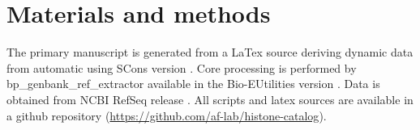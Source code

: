\section{Materials and methods}
\label{sec:matmethods}

	The primary manuscript is generated from a LaTex source 
	deriving dynamic data from automatic using SCons version  \citep{SCons2005}.
	Core processing is performed by bp\_genbank\_ref\_extractor
	available in the Bio-EUtilities version  \citep{BioPerl2002}.
	Data is obtained from NCBI RefSeq release .
	All scripts and latex sources are available in a github repository (\url{https://github.com/af-lab/histone-catalog}).
